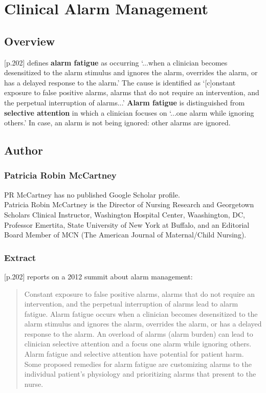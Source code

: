 \chapter{Clinical Alarm Management}

\section{Overview}

\citet{mccartney2012clinical}[p.202] defines \textbf{alarm fatigue} as occurring `...when a clinician becomes desensitized to the alarm stimulus and ignores the alarm, overrides the alarm, or has a delayed response to the alarm.' The cause is identified as `[c]onstant exposure to false positive alarms, alarms that do not require an intervention, and the perpetual interruption of alarms...' \textbf{Alarm fatigue} is distinguished from \textbf{selective attention} in which a clinician focuses on `...one alarm while ignoring others.' In case, an alarm is not being ignored: other alarms are  ignored. \\

\section{Author}

\subsection{Patricia Robin McCartney}

PR McCartney has no published Google Scholar profile. \\

Patricia Robin McCartney is the Director of Nursing Research and Georgetown Scholars Clinical Instructor, Washington Hospital Center, Waashington, DC, Professor Emertita, State University of New York at Buffalo, and an Editorial Board Member of MCN (The American Journal of Maternal/Child Nursing).

\subsection{Extract}

\citet{mccartney2012clinical}[p.202] reports on a 2012 summit about alarm management: \\

\begin{quotation}
	Constant exposure to false positive alarms, alarms that do not require an intervention, and the perpetual interruption of alarms lead to alarm fatigue. Alarm fatigue occurs when a clinician becomes desensitized to the alarm stimulus and ignores the alarm, overrides the alarm, or has a delayed response to the alarm. An overload of alarms (alarm burden) can lead to clinician selective attention and a focus one alarm while ignoring others. Alarm fatigue and selective attention have potential for patient harm. Some proposed remedies for alarm fatigue are customizing alarms to the individual patient's physiology and prioritizing alarms that present to the nurse.
\end{quotation}

